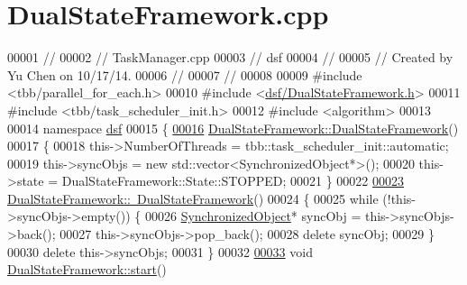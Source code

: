 \hypertarget{_dual_state_framework_8cpp_source}{}\section{Dual\+State\+Framework.\+cpp}
\label{_dual_state_framework_8cpp_source}

\begin{DoxyCode}
00001 \textcolor{comment}{//}
00002 \textcolor{comment}{//  TaskManager.cpp}
00003 \textcolor{comment}{//  dsf}
00004 \textcolor{comment}{//}
00005 \textcolor{comment}{//  Created by Yu Chen on 10/17/14.}
00006 \textcolor{comment}{//}
00007 \textcolor{comment}{//}
00008 
00009 \textcolor{preprocessor}{#include <tbb/parallel\_for\_each.h>}
00010 \textcolor{preprocessor}{#include <\hyperlink{_dual_state_framework_8h}{dsf/DualStateFramework.h}>}
00011 \textcolor{preprocessor}{#include <tbb/task\_scheduler\_init.h>}
00012 \textcolor{preprocessor}{#include <algorithm>}
00013 
00014 \textcolor{keyword}{namespace }\hyperlink{namespacedsf}{dsf}
00015 \{
\hypertarget{_dual_state_framework_8cpp_source_l00016}{}\hyperlink{classdsf_1_1_dual_state_framework_ab2c3f064dee1876d92694544d032b942}{00016}     \hyperlink{classdsf_1_1_dual_state_framework_ab2c3f064dee1876d92694544d032b942}{DualStateFramework::DualStateFramework}()
00017     \{
00018         this->NumberOfThreads = tbb::task\_scheduler\_init::automatic;
00019         this->syncObjs = \textcolor{keyword}{new} std::vector<SynchronizedObject*>();
00020         this->state = DualStateFramework::State::STOPPED;
00021     \}
00022     
\hypertarget{_dual_state_framework_8cpp_source_l00023}{}\hyperlink{classdsf_1_1_dual_state_framework_a0e5246056c73a684d0a167f3ed6d1fb1}{00023}     \hyperlink{classdsf_1_1_dual_state_framework_a0e5246056c73a684d0a167f3ed6d1fb1}{DualStateFramework::~DualStateFramework}()
00024     \{
00025         \textcolor{keywordflow}{while} (!this->syncObjs->empty()) \{
00026             \hyperlink{classdsf_1_1_synchronized_object}{SynchronizedObject}* syncObj = this->syncObjs->back();
00027             this->syncObjs->pop\_back();
00028             \textcolor{keyword}{delete} syncObj;
00029         \}
00030         \textcolor{keyword}{delete} this->syncObjs;
00031     \}
00032     
\hypertarget{_dual_state_framework_8cpp_source_l00033}{}\hyperlink{classdsf_1_1_dual_state_framework_ab17692c652ab856818d5e8f0dd82f194}{00033}     \textcolor{keywordtype}{void} \hyperlink{classdsf_1_1_dual_state_framework_ab17692c652ab856818d5e8f0dd82f194}{DualStateFramework::start}()

\end{DoxyCode}
